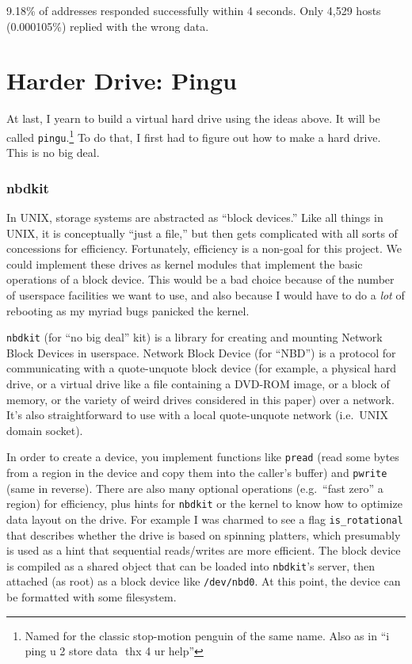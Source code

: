\documentclass[twocolumn]{article}
\begin{document}
9.18\% of addresses responded successfully within 4 seconds. Only
4,529 hosts (0.000105\%) replied with the wrong data.

\section{Harder Drive: Pingu} \label{sec:pingu}

At last, I yearn to build a virtual hard drive using the ideas above.
It will be called {\tt pingu}.\!\footnote{Named for the classic
  stop-motion penguin of the same name. Also as in ``i ping u 2 store
  data\,\, thx 4 ur help''} To do that, I first had to figure out how
to make a hard drive. This is no big deal.

\subsubsection{nbdkit} \label{sec:nbdkit}

In UNIX, storage systems are abstracted as ``block devices.'' Like all
things in UNIX, it is conceptually ``just a file,'' but then gets
complicated with all sorts of concessions for efficiency. Fortunately,
efficiency is a non-goal for this project. We could implement these
drives as kernel modules that implement the basic operations of a
block device. This would be a bad choice because of the number of
userspace facilities we want to use, and also because I would have to
do a {\em lot} of rebooting as my myriad bugs panicked the kernel.

{\tt nbdkit} (for ``no big deal'' kit) is a library for creating and
mounting Network Block Devices in userspace. Network Block Device (for
``NBD'') is a protocol for communicating with a quote-unquote block
device (for example, a physical hard drive, or a virtual drive like a
file containing a DVD-ROM image, or a block of memory, or the variety
of weird drives considered in this paper) over a network. It's also
straightforward to use with a local quote-unquote network (i.e.~UNIX
domain socket).

In order to create a device, you implement functions like {\tt pread}
(read some bytes from a region in the device and copy them into the
caller's buffer) and {\tt pwrite} (same in reverse). There are also
many optional operations (e.g.~``fast zero'' a region) for efficiency,
plus hints for {\tt nbdkit} or the kernel to know how to optimize data
layout on the drive. For example I was charmed to see a flag
\verb+is_rotational+ that describes whether the drive is based on
spinning platters, which presumably is used as a hint that sequential
reads/writes are more efficient. The block device is compiled as a
shared object that can be loaded into {\tt nbdkit}'s server, then
attached (as root) as a block device like {\tt /dev/nbd0}. At this
point, the device can be formatted with some filesystem.
\end{document}
